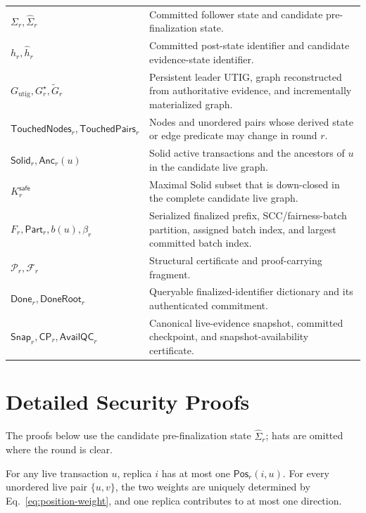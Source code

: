 \begin{table}[t]
\begin{tabular}{p{}p{}}
$\Sigma_r,\widehat\Sigma_r$ & Committed follower state and candidate pre-finalization state. \\
$h_r,\widehat h_r$ & Committed post-state identifier and candidate evidence-state identifier. \\
$G_{\mathrm{utig}},G_r^\star,\widetilde G_r$ & Persistent leader UTIG, graph reconstructed from authoritative evidence, and incrementally materialized graph. \\
$\mathsf{TouchedNodes}_r,\mathsf{TouchedPairs}_r$ & Nodes and unordered pairs whose derived state or edge predicate may change in round $r$. \\
$\mathsf{Solid}_r,\mathsf{Anc}_r(u)$ & Solid active transactions and the ancestors of $u$ in the candidate live graph. \\
$K_r^{\mathsf{safe}}$ & Maximal Solid subset that is down-closed in the complete candidate live graph. \\
$F_r,\mathsf{Part}_r,b(u),\beta_r$ & Serialized finalized prefix, SCC/fairness-batch partition, assigned batch index, and largest committed batch index. \\
$\mathcal P_r,\mathcal F_r$ & Structural certificate and proof-carrying fragment. \\
$\mathsf{Done}_r,\mathsf{DoneRoot}_r$ & Queryable finalized-identifier dictionary and its authenticated commitment. \\
$\mathsf{Snap}_r,\mathsf{CP}_r,\mathsf{AvailQC}_r$ & Canonical live-evidence snapshot, committed checkpoint, and snapshot-availability certificate. \\
\hline
\end{tabular}
\end{table}

\section{Detailed Security Proofs}
\label{app:autig-security-details}

The proofs below use the candidate pre-finalization state
$\widehat\Sigma_r$; hats are omitted where the round is clear.

\begin{lemma}
\label{lem:position-uniqueness}
For any live transaction $u$, replica $i$ has at most one
$\mathsf{Pos}_r(i,u)$.  For every unordered live pair $\{u,v\}$, the two
weights are uniquely determined by Eq.~\eqref{eq:position-weight}, and one
replica contributes to at most one direction.
\end{lemma}

